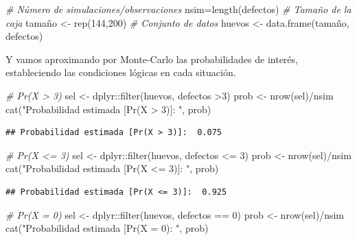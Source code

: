 \documentclass[
]{book}
\newenvironment{Shaded}{\begin{snugshade}}{\end{snugshade}}
\newcommand{\CommentTok}[1]{\textcolor[rgb]{0.56,0.35,0.01}{\textit{#1}}}
\newcommand{\DecValTok}[1]{\textcolor[rgb]{0.00,0.00,0.81}{#1}}
\newcommand{\FunctionTok}[1]{\textcolor[rgb]{0.00,0.00,0.00}{#1}}
\newcommand{\NormalTok}[1]{#1}
\newcommand{\OtherTok}[1]{\textcolor[rgb]{0.56,0.35,0.01}{#1}}
\newcommand{\SpecialCharTok}[1]{\textcolor[rgb]{0.00,0.00,0.00}{#1}}
\newcommand{\StringTok}[1]{\textcolor[rgb]{0.31,0.60,0.02}{#1}}
\theoremstyle{definition}
\theoremstyle{definition}
\theoremstyle{definition}
\theoremstyle{definition}
\theoremstyle{remark}
\begin{document}
\begin{Shaded}
\begin{Highlighting}[]
\CommentTok{\# Número de simulaciones/observaciones}
\NormalTok{nsim}\OtherTok{=}\FunctionTok{length}\NormalTok{(defectos)}
\CommentTok{\# Tamaño de la caja}
\NormalTok{tamaño }\OtherTok{\textless{}{-}} \FunctionTok{rep}\NormalTok{(}\DecValTok{144}\NormalTok{,}\DecValTok{200}\NormalTok{)}
\CommentTok{\# Conjunto de datos}
\NormalTok{huevos }\OtherTok{\textless{}{-}} \FunctionTok{data.frame}\NormalTok{(tamaño, defectos)}
\end{Highlighting}
\end{Shaded}

Y vamos aproximando por Monte-Carlo las probabilidades de interés, estableciendo las condiciones lógicas en cada situación.

\begin{Shaded}
\begin{Highlighting}[]
\CommentTok{\# Pr(X \textgreater{} 3)}
\NormalTok{sel }\OtherTok{\textless{}{-}}\NormalTok{ dplyr}\SpecialCharTok{::}\FunctionTok{filter}\NormalTok{(huevos, defectos }\SpecialCharTok{\textgreater{}}\DecValTok{3}\NormalTok{)}
\NormalTok{prob }\OtherTok{\textless{}{-}} \FunctionTok{nrow}\NormalTok{(sel)}\SpecialCharTok{/}\NormalTok{nsim}
\FunctionTok{cat}\NormalTok{(}\StringTok{"Probabilidad estimada [Pr(X \textgreater{} 3)]: "}\NormalTok{, prob)}
\end{Highlighting}
\end{Shaded}

\begin{verbatim}
## Probabilidad estimada [Pr(X > 3)]:  0.075
\end{verbatim}

\begin{Shaded}
\begin{Highlighting}[]
\CommentTok{\# Pr(X \textless{}= 3)}
\NormalTok{sel }\OtherTok{\textless{}{-}}\NormalTok{ dplyr}\SpecialCharTok{::}\FunctionTok{filter}\NormalTok{(huevos, defectos }\SpecialCharTok{\textless{}=} \DecValTok{3}\NormalTok{)}
\NormalTok{prob }\OtherTok{\textless{}{-}} \FunctionTok{nrow}\NormalTok{(sel)}\SpecialCharTok{/}\NormalTok{nsim}
\FunctionTok{cat}\NormalTok{(}\StringTok{"Probabilidad estimada [Pr(X \textless{}= 3)]: "}\NormalTok{, prob)}
\end{Highlighting}
\end{Shaded}

\begin{verbatim}
## Probabilidad estimada [Pr(X <= 3)]:  0.925
\end{verbatim}

\begin{Shaded}
\begin{Highlighting}[]
\CommentTok{\# Pr(X = 0)}
\NormalTok{sel }\OtherTok{\textless{}{-}}\NormalTok{ dplyr}\SpecialCharTok{::}\FunctionTok{filter}\NormalTok{(huevos, defectos }\SpecialCharTok{==} \DecValTok{0}\NormalTok{)}
\NormalTok{prob }\OtherTok{\textless{}{-}} \FunctionTok{nrow}\NormalTok{(sel)}\SpecialCharTok{/}\NormalTok{nsim}
\FunctionTok{cat}\NormalTok{(}\StringTok{"Probabilidad estimada [Pr(X = 0): "}\NormalTok{, prob)}
\end{Highlighting}
\end{Shaded}
\end{document}
